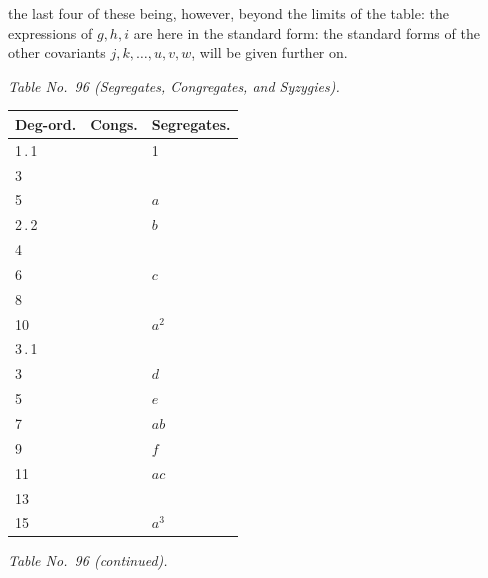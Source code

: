 \documentclass[11pt]{article}
\begin{document}
\noindent the last four of these being, however, beyond the limits of the table: the expressions of $g, h, i$ are here in the standard form: the standard forms of the other covariants $j, k, \ldots, u, v, w$, will be given further on.

\medskip

\begin{center}
\textit{Table No.\ 96 (Segregates, Congregates, and Syzygies).}
\end{center}

\medskip

\begin{center}
\begin{tabular}{lll}
Deg-ord. & Congs. & Segregates. \\
\hline
1\,.\,1 & & 1 \\
3 & & \\
5 & & $a$ \\
2\,.\,2 & & $b$ \\
4 & & \\
6 & & $c$ \\
8 & & \\
10 & & $a^{2}$ \\
3\,.\,1 & & \\
3 & & $d$ \\
5 & & $e$ \\
7 & & $ab$ \\
9 & & $f$ \\
11 & & $ac$ \\
13 & & \\
15 & & $a^{3}$ \\
\end{tabular}
\end{center}


\begin{center}
\textit{Table No.\ 96 (continued).}
\end{center}
\end{document}

